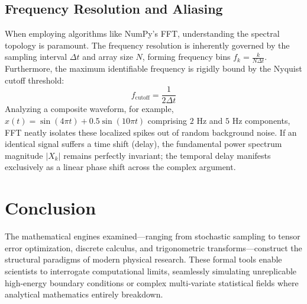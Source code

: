 \documentclass[aps, reprint, twocolumn, superscriptaddress, floatfix]{revtex4-2}
\begin{document}
\subsection{Frequency Resolution and Aliasing}
When employing algorithms like NumPy's FFT, understanding the spectral topology is paramount. The frequency resolution is inherently governed by the sampling interval $\Delta t$ and array size $N$, forming frequency bins $f_k = \frac{k}{N \Delta t}$. Furthermore, the maximum identifiable frequency is rigidly bound by the Nyquist cutoff threshold:
\begin{equation}
    f_{\text{cutoff}} = \frac{1}{2 \Delta t}
\end{equation}
Analyzing a composite waveform, for example, $x(t) = \sin(4\pi t) + 0.5\sin(10\pi t)$ comprising $2\text{ Hz}$ and $5\text{ Hz}$ components, FFT neatly isolates these localized spikes out of random background noise. If an identical signal suffers a time shift (delay), the fundamental power spectrum magnitude $|X_k|$ remains perfectly invariant; the temporal delay manifests exclusively as a linear phase shift across the complex argument.

\section{Conclusion}

The mathematical engines examined—ranging from stochastic sampling to tensor error optimization, discrete calculus, and trigonometric transforms—construct the structural paradigms of modern physical research. These formal tools enable scientists to interrogate computational limits, seamlessly simulating unreplicable high-energy boundary conditions or complex multi-variate statistical fields where analytical mathematics entirely breakdown.




\end{document}
